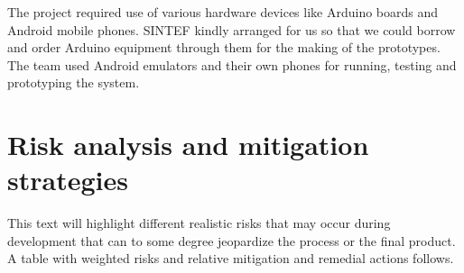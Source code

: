 The project required use of various hardware devices like Arduino boards and Android mobile phones.
SINTEF kindly arranged for us so that we could borrow and order Arduino equipment through them for the making of the prototypes.
The team used Android emulators and their own phones for running, testing and prototyping the system.

\section{Risk analysis and mitigation strategies}

This text will highlight different realistic risks that may occur during development
that can to some degree jeopardize the process or the final product.
A table with weighted risks and relative mitigation and remedial actions follows.

